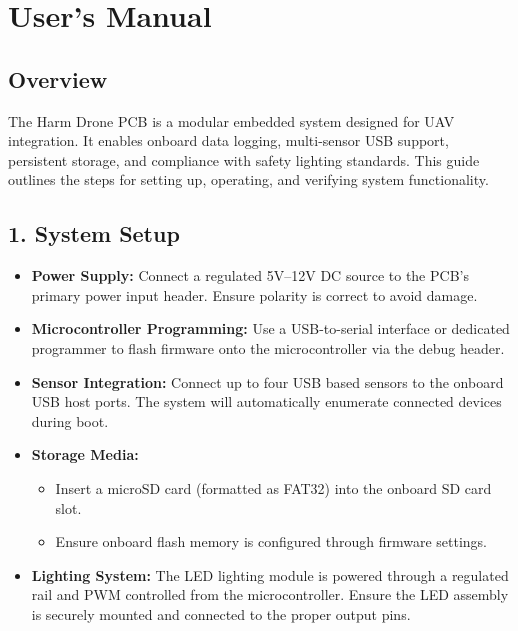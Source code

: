 \documentclass[12pt]{article}
\begin{document}
\section{User’s Manual}

\subsection*{Overview}
\par The Harm Drone PCB is a modular embedded system designed for UAV integration. It enables onboard data logging, multi-sensor USB support, persistent storage, and compliance with safety lighting standards. This guide outlines the steps for setting up, operating, and verifying system functionality.

\subsection*{1. System Setup}

\begin{itemize}
    \item \textbf{Power Supply:} Connect a regulated 5V–12V DC source to the PCB's primary power input header. Ensure polarity is correct to avoid damage.
    \item \textbf{Microcontroller Programming:} Use a USB-to-serial interface or dedicated programmer to flash firmware onto the microcontroller via the debug header.
    \item \textbf{Sensor Integration:} Connect up to four USB based sensors to the onboard USB host ports. The system will automatically enumerate connected devices during boot.
    \item \textbf{Storage Media:}
    \begin{itemize}
        \item Insert a microSD card (formatted as FAT32) into the onboard SD card slot.
        \item Ensure onboard flash memory is configured through firmware settings.
    \end{itemize}
    \item \textbf{Lighting System:} The LED lighting module is powered through a regulated rail and PWM controlled from the microcontroller. Ensure the LED assembly is securely mounted and connected to the proper output pins.
\end{itemize}
\end{document}
